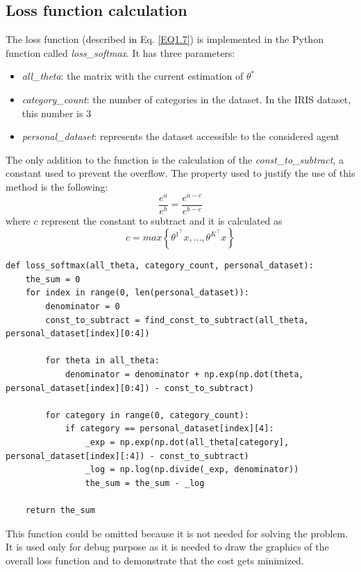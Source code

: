 \documentclass[a4paper,11pt,oneside]{book}
\begin{document}
\subsection{Loss function calculation}
The loss function (described in Eq. \ref{EQ1.7}) is implemented in the Python function called \textit{loss\_softmax}. It has three parameters:\\
\begin{itemize}
	\item \textit{all\_theta}: the matrix with the current estimation of $\theta^*$
	\item \textit{category\_count}: the number of categories in the dataset. In the IRIS dataset, this number is $3$
	\item \textit{personal\_dataset}: represents the dataset accessible to the considered agent
\end{itemize}
The only addition to the function is the calculation of the \textit{const\_to\_subtract}, a constant used to prevent the overflow. The property used to justify the use of this method is the following:
\begin{equation}
	\dfrac{e^a}{e^b} = \dfrac{e^{a-c}}{e^{b-c}}
\end{equation}
where $c$ represent the constant to subtract and it is calculated as
\begin{equation}
	c = max \left\{ \theta^{1^\top}x, \dots,  \theta^{K^\top}x \right\}
\end{equation}

\begin{lstlisting}
def loss_softmax(all_theta, category_count, personal_dataset):
    the_sum = 0
    for index in range(0, len(personal_dataset)):
        denominator = 0
        const_to_subtract = find_const_to_subtract(all_theta, personal_dataset[index][0:4])
		
        for theta in all_theta:
            denominator = denominator + np.exp(np.dot(theta, personal_dataset[index][0:4]) - const_to_subtract)
		
        for category in range(0, category_count):
            if category == personal_dataset[index][4]:
                _exp = np.exp(np.dot(all_theta[category], personal_dataset[index][:4]) - const_to_subtract)
                _log = np.log(np.divide(_exp, denominator))
                the_sum = the_sum - _log
	
	return the_sum
\end{lstlisting}

This function could be omitted because it is not needed for solving the problem. It is used only for debug purpose as it is needed to draw the graphics of the overall loss function and to demonstrate that the cost gets minimized.
\end{document}
